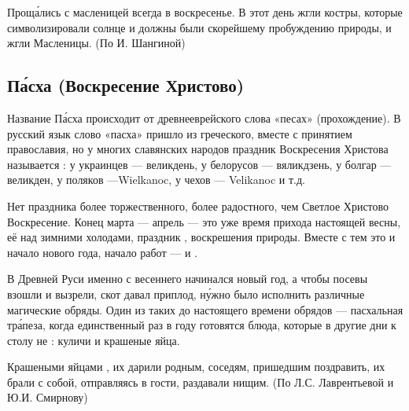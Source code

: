 Прощ\'{а}лись с масленицей всегда в воскресенье.
В этот день жгли костры, которые символизировали солнце и должны были  скорейшему пробуждению природы, и жгли  Масленицы. (По И. Шангиной)



\subsection{П\'{а}сха (Воскресение Христово)}
Название П\'{а}сха происходит от древнееврейского слова «песах» (прохождение). В русский язык слово «пасха» пришло из греческого, вместе с принятием православия, но у многих славянских народов праздник Воскресения Христова называется : у украинцев --- великдень, у белорусов --- вяликдзень, у болгар --- великден, у поляков ---Wielkanoc, у чехов --- Velikanoc и т.д.

Нет праздника более торжественного, более радостного, чем Светлое
Христово Воскресение. Конец марта --- апрель --- это уже время прихода
настоящей весны, её 
над зимними холодами, праздник ,
воскрешения природы. Вместе с тем это и начало нового
года, начало  работ
---  и .

В Древней Руси именно с весеннего 
начинался новый год, а чтобы посевы  взошли и вызрели,
скот давал приплод, н\'{у}жно было исполнить различные магические обряды.
Один из таких  до настоящего времени обрядов
--- пасхальная тр\'{а}пеза, когда единственный раз в году готовятся блюда,
которые в другие дни к столу не :
куличи и крашеные яйца.

Крашеными яйцами ,
их дарили родным, соседям, пришедшим поздравить, их брали с собой, отправляясь
в гости, раздавали нищим. (По Л.С. Лаврентьевой и Ю.И. Смирнову)

